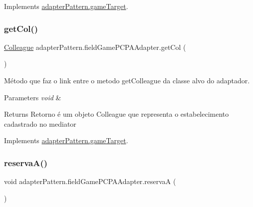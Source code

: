 Implements \mbox{\hyperlink{interfaceadapter_pattern_1_1game_target_a32fce3f3dd420116a031b051f2464304}{adapter\+Pattern.\+game\+Target}}.

\mbox{\label{classadapter_pattern_1_1field_game_p_c_p_a_adapter_a3ecb2186e522338f6d1530d4c365581b}} 
\subsubsection{\texorpdfstring{getCol()}{getCol()}}
{\footnotesize\ttfamily \mbox{\hyperlink{classmediator_pattern_1_1_colleague}{Colleague}} adapter\+Pattern.\+field\+Game\+P\+C\+P\+A\+Adapter.\+get\+Col (\begin{DoxyParamCaption}{ }\end{DoxyParamCaption})}



Método que faz o link entre o metodo get\+Colleague da classe alvo do adaptador. 


\begin{DoxyParams}{Parameters}
{\em void} & \\
\hline
\end{DoxyParams}
\begin{DoxyReturn}{Returns}
Retorno é um objeto Colleague que representa o estabelecimento cadastrado no mediator 
\end{DoxyReturn}


Implements \mbox{\hyperlink{interfaceadapter_pattern_1_1game_target_ad3fc8b4c4a732bcc875071ed0c081261}{adapter\+Pattern.\+game\+Target}}.

\mbox{\label{classadapter_pattern_1_1field_game_p_c_p_a_adapter_a75f856d4bfd4522ac2eff912c7ebf448}} 
\subsubsection{\texorpdfstring{reservaA()}{reservaA()}}
{\footnotesize\ttfamily void adapter\+Pattern.\+field\+Game\+P\+C\+P\+A\+Adapter.\+reservaA (\begin{DoxyParamCaption}{ }\end{DoxyParamCaption})}



